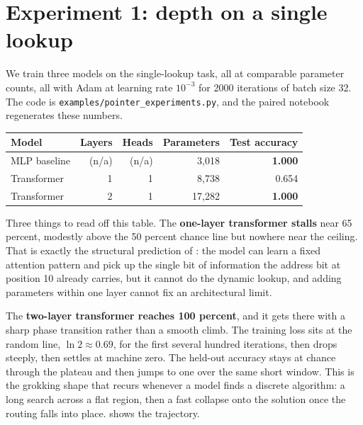
\section{Experiment 1: depth on a single lookup}\label{sec:exp-single-lookup}

We train three models on the single-lookup task, all at comparable parameter
counts, all with Adam at learning rate $10^{-3}$ for 2000 iterations of batch
size 32. The code is \texttt{examples/pointer\_experiments.py}, and the
paired notebook regenerates these numbers.

\begin{center}
\begin{tabular}{@{}lrrrr@{}}
\toprule
Model & Layers & Heads & Parameters & Test accuracy \\
\midrule
MLP baseline & (n/a) & (n/a) & 3{,}018 & \textbf{1.000} \\
Transformer & 1 & 1 & 8{,}738 & 0.654 \\
Transformer & 2 & 1 & 17{,}282 & \textbf{1.000} \\
\bottomrule
\end{tabular}
\end{center}

Three things to read off this table. The \textbf{one-layer transformer
stalls} near 65 percent, modestly above the 50 percent chance line but
nowhere near the ceiling. That is exactly the structural prediction of
: the model can learn a fixed attention pattern and
pick up the single bit of information the address bit at position 10 already
carries, but it cannot do the dynamic lookup, and adding parameters within one
layer cannot fix an architectural limit.

The \textbf{two-layer transformer reaches 100 percent}, and it gets there with
a sharp phase transition rather than a smooth climb. The training loss sits at
the random line, $\ln 2 \approx 0.69$, for the first several hundred
iterations, then drops steeply, then settles at machine zero. The held-out
accuracy stays at chance through the plateau and then jumps to one over the
same short window. This is the grokking shape that recurs whenever a model
finds a discrete algorithm: a long search across a flat region, then a fast
collapse onto the solution once the routing falls into place.
 shows the trajectory.

